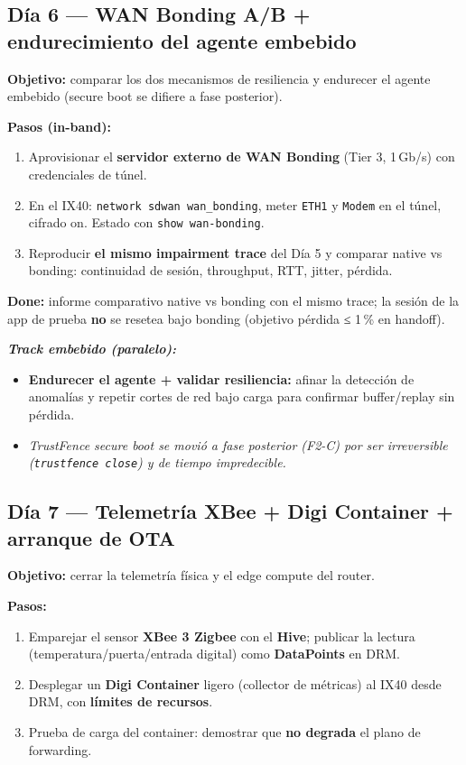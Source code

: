 \documentclass[11pt,a4paper]{article}
\newcommand{\file}[1]{\texttt{#1}}
\newcommand{\done}{\textbf{Done:}}
\newcommand{\embebido}{\textit{Track embebido (paralelo):}}
\begin{document}
\subsection{Día 6 — WAN Bonding A/B + endurecimiento del agente embebido}

\textbf{Objetivo:} comparar los dos mecanismos de resiliencia y endurecer el agente embebido
(secure boot se difiere a fase posterior).

\textbf{Pasos (in-band):}
\begin{enumerate}
  \item Aprovisionar el \textbf{servidor externo de WAN Bonding} (Tier 3, 1\,Gb/s) con
        credenciales de túnel.
  \item En el IX40: \file{network sdwan wan\_bonding}, meter \file{ETH1} y \file{Modem} en el
        túnel, cifrado on. Estado con \file{show wan-bonding}.
  \item Reproducir \textbf{el mismo impairment trace} del Día 5 y comparar native vs bonding:
        continuidad de sesión, throughput, RTT, jitter, pérdida.
\end{enumerate}

\begin{clave}
\small
\done{} informe comparativo native vs bonding con el mismo trace; la sesión de la app de prueba
\textbf{no} se resetea bajo bonding (objetivo pérdida ≤ 1\,\% en handoff).
\end{clave}

\textbf{\embebido}
\begin{itemize}
  \item \textbf{Endurecer el agente + validar resiliencia:} afinar la detección de anomalías y
        repetir cortes de red bajo carga para confirmar buffer/replay sin pérdida.
  \item \textit{TrustFence secure boot se movió a fase posterior (F2-C) por ser irreversible
        (\file{trustfence close}) y de tiempo impredecible.}
\end{itemize}

\subsection{Día 7 — Telemetría XBee + Digi Container + arranque de OTA}

\textbf{Objetivo:} cerrar la telemetría física y el edge compute del router.

\textbf{Pasos:}
\begin{enumerate}
  \item Emparejar el sensor \textbf{XBee 3 Zigbee} con el \textbf{Hive}; publicar la lectura
        (temperatura/puerta/entrada digital) como \textbf{DataPoints} en DRM.
  \item Desplegar un \textbf{Digi Container} ligero (collector de métricas) al IX40 desde DRM,
        con \textbf{límites de recursos}.
  \item Prueba de carga del container: demostrar que \textbf{no degrada} el plano de forwarding.
\end{enumerate}
\end{document}
